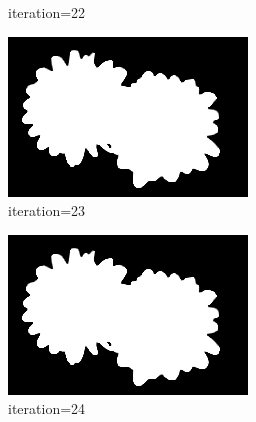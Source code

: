 \documentclass{article}
\begin{document}
\begin{figure}[t]
\begin{subfigure}[t]{0.19\textwidth}
\vspace{-0.6cm}
\caption{iteration=22}
\end{subfigure}
\begin{subfigure}[t]{0.19\textwidth}
\centering
\includegraphics[width=\textwidth]{./images/marginals_iter_23.png}
\vspace{-0.6cm}
\caption{iteration=23}
\end{subfigure}
\begin{subfigure}[t]{0.19\textwidth}
\centering
\includegraphics[width=\textwidth]{./images/marginals_iter_24.png}
\vspace{-0.6cm}
\caption{iteration=24}
\end{subfigure}
\begin{subfigure}[t]{0.19\textwidth}
\centering

\end{subfigure}
\end{figure}
\end{document}
